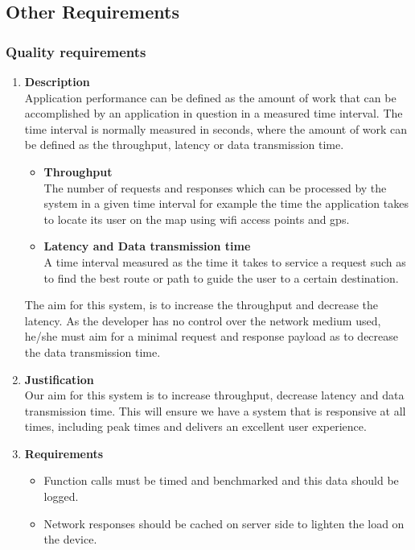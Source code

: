 \documentclass[a4paper,10pt]{article}
\begin{document}
	\subsection{Other Requirements}
	\subsubsection{Quality requirements}
	\begin{enumerate}
	\item \textbf{Description} \\
	Application performance can be defined as the amount of work that can be accomplished by an application in question in a measured time interval. The time interval is normally measured in seconds, where the amount of work can be defined as the throughput, latency or data transmission time.
		\begin{itemize}
			\item \textbf{Throughput} \\
			The number of requests and responses which can be processed by the system in a given time interval for example the time the application takes to locate its user on the map using wifi access points and gps.
			\item \textbf{Latency and Data transmission time} \\
			A time interval measured as the time it takes to service a request such as to find the best route or path to guide the user to a certain destination. 
		\end{itemize}

		The aim for this system, is to increase the throughput and decrease the latency. As the developer has no control over the network medium used, he/she must aim for a minimal request and response payload as to decrease the data transmission time.
	\item \textbf{Justification} \\
	Our aim for this system is to increase throughput, decrease latency and data transmission time. This will ensure we have a system that is responsive at all times, including peak times and delivers an excellent user experience.
	\item \textbf{Requirements}
		\begin{itemize}
			\item Function calls must be timed and benchmarked and this data should be logged.
			\item Network responses should be cached on server side to lighten the load on the device.
			\end{itemize}
	\end{enumerate}
\end{document}
